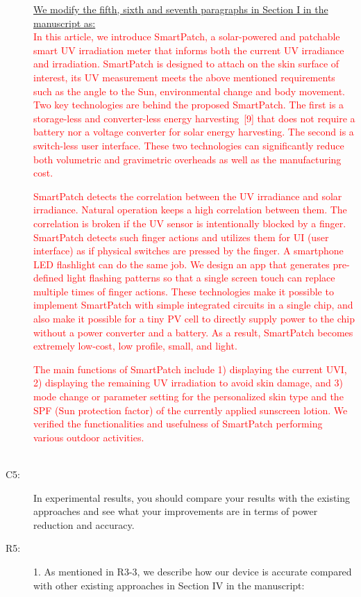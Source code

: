 \documentclass[onecolumn]{IEEEconf}
\begin{document}
\begin{description}
\underline{We modify the fifth, sixth and seventh paragraphs in Section I in the manuscript as:}\\
\textcolor{red}{In this article, we introduce SmartPatch, a solar-powered and patchable smart UV irradiation meter that informs both the current UV irradiance and irradiation. SmartPatch is designed to attach on the skin surface of interest, its UV measurement meets the above mentioned requirements such as the angle to the Sun, environmental change and body movement. Two key technologies are behind the proposed SmartPatch. The first is a storage-less and converter-less energy harvesting~[9] that does not require a battery nor a voltage converter for solar energy harvesting. The second is a switch-less user interface. These two technologies can significantly reduce both volumetric and gravimetric overheads as well as the manufacturing cost.}

\textcolor{red}{SmartPatch detects the correlation between the UV irradiance and solar irradiance. Natural operation keeps a high correlation between them. The correlation is broken if the UV sensor is intentionally blocked by a finger. SmartPatch detects such finger actions and utilizes them for UI (user interface) as if physical switches are pressed by the finger. A smartphone LED flashlight can do the same job. We design an app that  generates pre-defined light flashing patterns so that a single screen touch can replace multiple times of finger actions. These technologies make it possible to implement SmartPatch with simple integrated circuits in a single chip, and also make it possible for a tiny PV cell to directly supply power to the chip without a power converter and a battery. As a result, SmartPatch becomes extremely low-cost, low profile, small, and light.}

 \textcolor{red}{The main functions of SmartPatch include 1) displaying the current UVI, 2) displaying the remaining UV irradiation to avoid skin damage, and 3) mode change or parameter setting for the personalized skin type and the SPF (Sun protection factor) of the currently applied sunscreen lotion. We verified the functionalities and usefulness of SmartPatch performing various outdoor activities.}\\
~\\

\item [C5: ] In experimental results, you should compare your results with the existing approaches and see what your improvements are in terms of power reduction and accuracy.
\item [R5: ] 
1. As mentioned in R3-3, we describe how our device is accurate compared with other existing approaches in Section IV in the manuscript:\\


\end{description}
\end{document}
